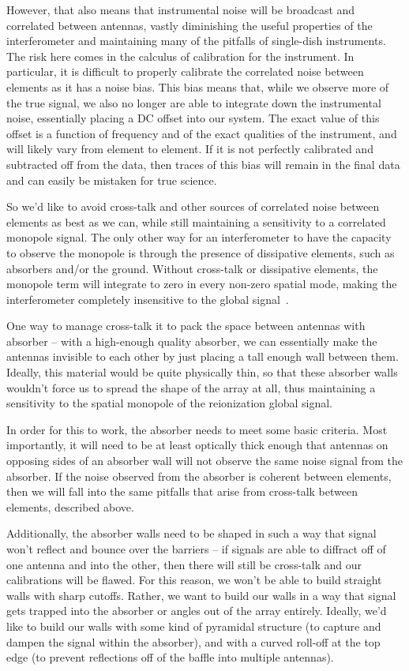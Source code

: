 However, that also means that instrumental noise will be broadcast and 
correlated between antennas, vastly diminishing the useful properties of the 
interferometer and maintaining many of the pitfalls of single-dish instruments.  
The risk here comes in the calculus of calibration for the instrument.
In particular, it is difficult to properly calibrate the correlated noise 
between elements as it has a noise bias. This bias means that, while we observe 
more of the true signal, we also no longer are able to integrate down the 
instrumental noise, essentially placing a DC offset into our system. The exact 
value of this offset is a function of frequency and of the exact qualities of 
the instrument, and will likely vary from element to element. If it is not 
perfectly calibrated and subtracted off from the data, then traces of this bias 
will remain in the final data and can easily be mistaken for true science.

So we'd like to avoid cross-talk and other sources of correlated noise between 
elements as best as we can, while still maintaining a sensitivity to a 
correlated monopole signal. The only other way for an interferometer to have 
the capacity to observe the monopole is through the presence of dissipative 
elements, such as absorbers and/or the ground.  Without cross-talk or 
dissipative elements, the monopole term will integrate to zero in every 
non-zero spatial mode, making the interferometer completely insensitive to the 
global signal~\citet{venumadhav2016}.

One way to manage cross-talk it to pack the space between antennas with 
absorber -- with a high-enough quality absorber, we can essentially make the 
antennas invisible to each other by just placing a tall enough wall between 
them.  Ideally, this material would be quite physically thin, so that these 
absorber walls wouldn't force us to spread the shape of the array at all, thus 
maintaining a sensitivity to the spatial monopole of the reionization global 
signal.

In order for this to work, the absorber needs to meet some basic criteria. Most 
importantly, it will need to be at least optically thick enough that antennas 
on opposing sides of an absorber wall will not observe the same noise signal 
from the absorber. If the noise observed from the absorber is coherent between 
elements, then we will fall into the same pitfalls that arise from cross-talk 
between elements, described above.

Additionally, the absorber walls need to be shaped in such a way that signal 
won't reflect and bounce over the barriers -- if signals are able to diffract 
off of one antenna and into the other, then there will still be cross-talk and 
our calibrations will be flawed. For this reason, we won't be able to build 
straight walls with sharp cutoffs. Rather, we want to build our walls in a way 
that signal gets trapped into the absorber or angles out of the array entirely.  
Ideally, we'd like to build our walls with some kind of pyramidal structure (to 
capture and dampen the signal within the absorber), and with a curved roll-off 
at the top edge (to prevent reflections off of the baffle into multiple 
antennas).


